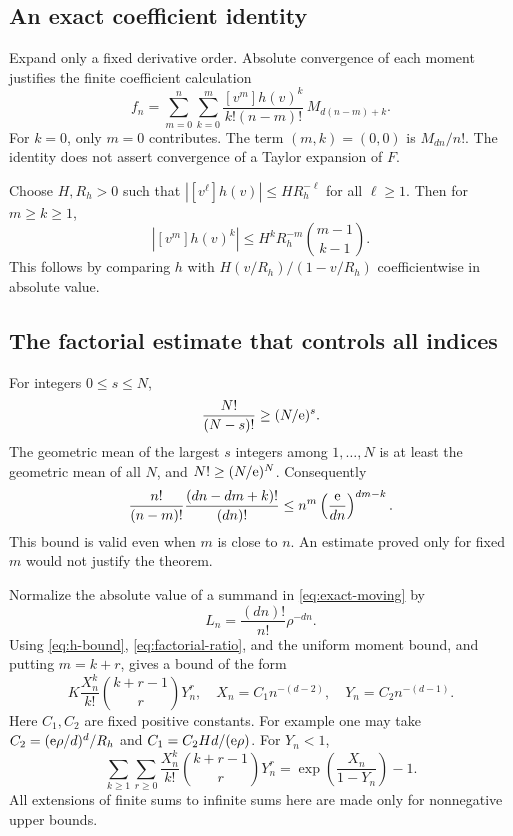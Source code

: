 \documentclass[11pt,a4paper]{article}
\numberwithin{equation}{section}
\theoremstyle{definition}\newtheorem{definition}[theorem]{Definition}
\theoremstyle{remark}\newtheorem{remark}[theorem]{Remark}
\theoremstyle{definition}
\begin{document}
\subsection{An exact coefficient identity}
Expand only a fixed derivative order. Absolute convergence of each moment
justifies the finite coefficient calculation
\begin{equation}
 f_n=\sum_{m=0}^{n}\sum_{k=0}^{m}
 \frac{[v^m]h(v)^k}{k!(n-m)!}\,M_{d(n-m)+k}.
 \label{eq:exact-moving}
\end{equation}
For $k=0$, only $m=0$ contributes. The term $(m,k)=(0,0)$ is $M_{dn}/n!$.
The identity does not assert convergence of a Taylor expansion of $F$.

Choose $H,R_h>0$ such that $|[v^\ell]h(v)|\le H R_h^{-\ell}$ for all
$\ell\ge1$. Then for $m\ge k\ge1$,
\begin{equation}
 |[v^m]h(v)^k|
 \le H^kR_h^{-m}\binom{m-1}{k-1}.
 \label{eq:h-bound}
\end{equation}
This follows by comparing $h$ with $H(v/R_h)/(1-v/R_h)$ coefficientwise in
absolute value.

\subsection{The factorial estimate that controls all indices}
For integers $0\le s\le N$,
\begin{equation}
 \frac{N!}{(N-s)!}\ge(N/\mathrm e)^s.
 \label{eq:falling}
\end{equation}
The geometric mean of the largest $s$ integers among $1,\dots,N$ is at least
the geometric mean of all $N$, and $N!\ge(N/\mathrm e)^N$.
Consequently
\begin{equation}
 \frac{n!}{(n-m)!}\frac{(dn-dm+k)!}{(dn)!}
 \le n^m\left(\frac{\mathrm e}{dn}\right)^{dm-k}.
 \label{eq:factorial-ratio}
\end{equation}
This bound is valid even when $m$ is close to $n$. An estimate proved only
for fixed $m$ would not justify the theorem.

Normalize the absolute value of a summand in \eqref{eq:exact-moving} by
\[
 L_n=\frac{(dn)!}{n!}\rho^{-dn}.
\]
Using \eqref{eq:h-bound}, \eqref{eq:factorial-ratio}, and the uniform moment
bound, and putting $m=k+r$, gives a bound of the form
\begin{equation}
 K\frac{X_n^k}{k!}\binom{k+r-1}{r}Y_n^r,
 \quad X_n=C_1n^{-(d-2)},\quad Y_n=C_2n^{-(d-1)}.
 \label{eq:global-bound}
\end{equation}
Here $C_1,C_2$ are fixed positive constants. For example one may take
$C_2=(\mathrm e\rho/d)^d/R_h$ and $C_1=C_2Hd/(\mathrm e\rho)$.
For $Y_n<1$,
\begin{equation}
 \sum_{k\ge1}\sum_{r\ge0}
 \frac{X_n^k}{k!}\binom{k+r-1}{r}Y_n^r
 =\exp\!\left(\frac{X_n}{1-Y_n}\right)-1.
 \label{eq:double-majorant}
\end{equation}
All extensions of finite sums to infinite sums here are made only for
nonnegative upper bounds.
\end{document}
